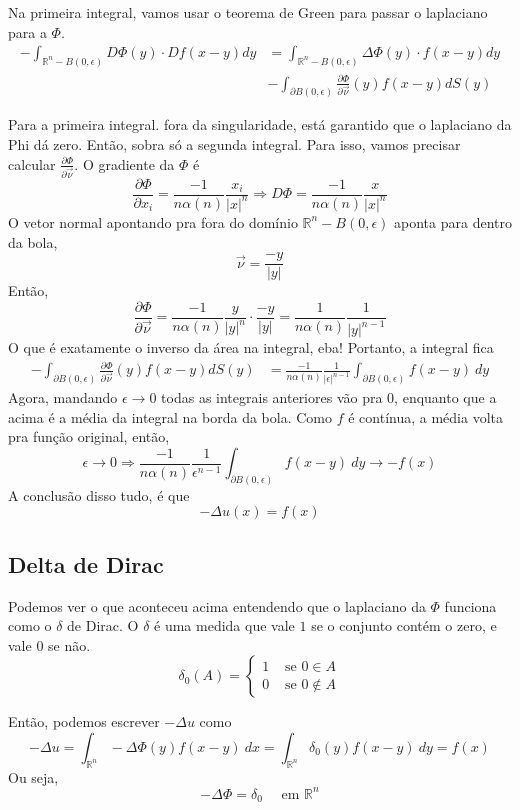 \documentclass[11pt]{article}
\newcommand{\Rn}{{\mathbb{R}^n}}
\newcommand{\p}{\partial}
\newcommand{\e}{\epsilon}
\newcommand{\pde}[2]{\frac{\p #1}{\p #2}}
\newcommand{\dirdev}[1]{\pde{#1}{\vec{\nu}}}
\begin{document}
Na primeira integral, vamos usar o teorema de Green para passar o laplaciano para a \(\Phi\). \begin{align*}
	 - \int_{\mathbb{R}^n - B(0, \epsilon)} D \Phi (y)\cdot D f(x-y) dy &= \int_{\mathbb{R}^n - B(0, \epsilon)} \Delta \Phi (y)\cdot f(x-y) dy \\ &-  \int_{\partial B(0, \epsilon)} \dirdev{\Phi }(y) f(x-y) dS(y)
\end{align*}

Para a primeira integral. fora da singularidade, está garantido que o laplaciano da Phi dá zero. Então, sobra só a segunda integral. Para isso, vamos precisar calcular \(\dirdev{\Phi}\). O gradiente da \(\Phi\) é \[\pde{\Phi}{x_i}= \frac{-1}{n \alpha(n)} \frac{x_i}{|x|^n} \Longrightarrow D\Phi = \frac{-1}{n \alpha(n)}\frac{x}{|x|^n}\]
O vetor normal apontando pra fora do domínio \(\Rn - B(0,\e)\) aponta para dentro da bola, \[\vec{\nu} = \frac{-y}{|y|}\]
Então, \[\dirdev{\Phi} =  \frac{-1}{n \alpha(n)}\frac{y}{|y|^n} \cdot \frac{-y}{|y|} = \frac{1}{n \alpha(n)} \frac{1}{|y|^{n-1}}\]
O que é exatamente o inverso da área na integral, eba! Portanto, a integral fica \begin{align*}
	 -  \int_{\partial B(0, \epsilon)} \dirdev{\Phi }(y) f(x-y) dS(y) &= \frac{-1}{n \alpha(n)} \frac{1}{|\e|^{n-1}}  \int_{\partial B(0, \epsilon)} f(x-y)\ dy 
\end{align*}
Agora, mandando \(\e \rightarrow 0 \) todas as integrais anteriores vão pra \(0\), enquanto que a acima é a média da integral na borda da bola. Como \(f\) é contínua, a média volta pra função original, então, \[\e \rightarrow 0 \Longrightarrow \frac{-1}{n \alpha(n)} \frac{1}{\e^{n-1}}  \int_{\partial B(0, \epsilon)} f(x-y)\ dy  \rightarrow -f(x) \]		
A conclusão disso tudo, é que
\[ -\Delta u(x) = f(x) \]

\subsection{Delta de Dirac}

Podemos ver o que aconteceu acima entendendo que o laplaciano da \(\Phi\) funciona como o \(\delta\) de Dirac. O \(\delta\) é uma medida que vale \(1\) se o conjunto contém o zero, e vale \(0\) se não. \[\delta_0(A) = \begin{cases}
	1 & \text{ se } 0 \in A \\
	0 & \text{ se } 0 \notin A
\end{cases}\]

Então, podemos escrever \(-\Delta u \) como \[-\Delta u = \int_\Rn -\Delta \Phi(y) f(x-y)\ dx = \int_\Rn \delta_0(y) f(x-y)\ dy = f(x)\]
Ou seja, \[-\Delta\Phi = \delta_0 \quad \text{ em }\Rn \]
\end{document}
